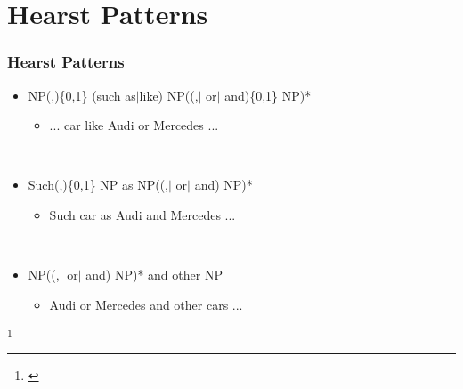 \section{Hearst Patterns}
\label{sec:hearst-patterns}

\begin{frame}
  \frametitle{Hearst Patterns}

  \begin{itemize}
  \item NP(,)\{0,1\} (such as$\vert$like)
    NP((,$\vert$ or$\vert$ and)\{0,1\} NP)*
    \begin{itemize}
    \item ... car like Audi or Mercedes ...
    \end{itemize}~\\

  \item Such(,)\{0,1\} NP as NP((,$\vert$ or$\vert$ and) NP)*
    \begin{itemize}
    \item Such car as Audi and Mercedes ...
    \end{itemize}~\\

  \item NP((,$\vert$ or$\vert$ and) NP)* and  other NP
    \begin{itemize}
    \item Audi or Mercedes and other cars ...
    \end{itemize}

  \end{itemize}

  \let\thefootnote\relax\footnote{\cite{Hearst:1992}}
\end{frame}

